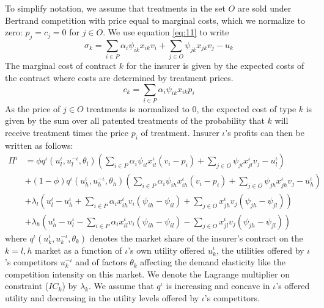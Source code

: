 \documentclass[a4paper,12pt]{article}
\begin{document}
To simplify notation, we assume that treatments in the set \(O\) are sold under Bertrand competition with price equal to marginal costs, which we normalize to zero: \(p_j = c_j =0\) for \(j \in O\). We use equation \eqref{eq:11} to write
\begin{equation}
\label{eq:13}
\sigma_k = \sum_{i \in P} \alpha_i \psi_{ik} x_{ik} v_i + \sum_{j \in O} \psi_{jk} x_{jk} v_j - u_k
\end{equation}
The marginal cost of contract \(k\) for the insurer is given by the expected costs of the contract where costs are determined by treatment prices.
\begin{equation}
\label{eq:14}
c_k = \sum_{i \in P} \alpha_i \psi_{ik} x_{ik} p_i
\end{equation}
As the price of \(j \in O\) treatments is normalized to 0, the expected cost of type \(k\) is given by the sum over all patented treatments of the probability that \(k\) will receive treatment times the price \(p_i\) of treatment. Insurer \(\iota\)'s profits can then be written as follows:
\begin{align} \nonumber
\Pi^{\iota} &= \phi q^{\iota}(u_l^{\iota},u_l^{-\iota},\theta_l) (\sum_{i \in P} \alpha_i \psi_{il} x_{il}^{\iota} (v_i-p_i) + \sum_{j \in O} \psi_{jl} x_{jl}^{\iota} v_j - u_l^{\iota}) \\ \nonumber
    &+ (1-\phi) q^{\iota}(u_h^{\iota},u_h^{-\iota},\theta_h) (\sum_{i \in P} \alpha_i \psi_{ih} x_{ih}^{\iota} (v_i-p_i) + \sum_{j \in O} \psi_{jh} x_{jh}^{\iota} v_j - u_h^{\iota}) \\
    \label{eq:15}
    &+ \lambda_l (u_l^{\iota} - u_h^{\iota} + \sum_{i \in P} \alpha_i x_{ih}^{\iota} v_i (\psi_{ih}-\psi_{il}) + \sum_{j \in O} x_{jh}^{\iota} v_j (\psi_{jh}-\psi_{jl})) \\ \nonumber
    &+ \lambda_h (u_h^{\iota} - u_l^{\iota} - \sum_{i \in P} \alpha_i x_{il}^{\iota} v_i (\psi_{ih}-\psi_{il}) - \sum_{j \in O} x_{jl}^{\iota} v_j (\psi_{jh}-\psi_{jl}))
\end{align}
where \(q^{\iota}(u_k^{\iota},u_k^{-\iota},\theta_k)\) denotes the market share of the insurer's contract on the \(k=l,h\) market as a function of \(\iota\)'s own utility offered \(u_k^{\iota}\), the utilities offered by \(\iota\)'s competitors \(u_k^{-\iota}\) and of factors \(\theta_k\) affecting the demand elasticity like the competition intensity on this market. We denote the Lagrange multiplier on constraint (\(IC_k\)) by \(\lambda_k\). We assume that \(q^{\iota}\) is increasing and concave in \(\iota\)'s offered utility and decreasing in the utility levels offered by \(\iota\)'s competitors.
\end{document}
